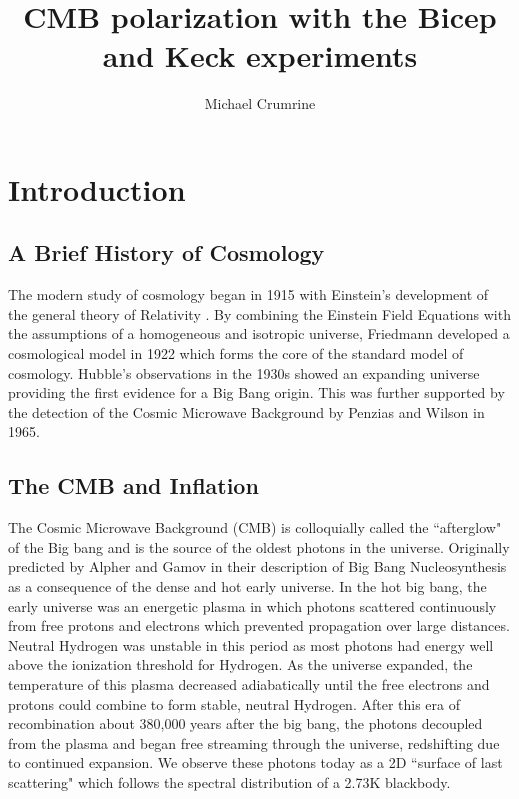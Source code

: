 \documentclass[12pt]{article}
\begin{document}
\author{Michael Crumrine}
\title{CMB polarization with the Bicep and Keck experiments}
\maketitle



\section{Introduction}

\subsection{A Brief History of Cosmology}
The modern study of cosmology began in 1915 with Einstein's development of the general
theory of Relativity \cite{cite:Einstein}. By combining the Einstein Field
Equations with the assumptions of a homogeneous and isotropic universe,
Friedmann developed a cosmological model in 1922 which forms the core of the standard
model of cosmology\cite{cite:Friedmann}. Hubble's observations in the 1930s
showed an expanding universe\cite{cite:Hubble} providing the first evidence
for a Big Bang origin. This was further supported by the detection of the
Cosmic Microwave Background by Penzias and Wilson in 1965\cite{cite:Penzias}.



\subsection{The CMB and Inflation}
The Cosmic Microwave Background (CMB) is colloquially called the ``afterglow"
of the Big bang and is the source of the oldest photons in the universe.
Originally predicted by Alpher and Gamov in their description of Big Bang
Nucleosynthesis as a consequence of the dense and hot early
universe\cite{cite:BBN}.  In the hot big bang, the early universe was an
energetic plasma in which photons scattered continuously from free protons and
electrons which prevented propagation over large distances.  Neutral Hydrogen
was unstable in this period as most photons had energy well above the
ionization threshold for Hydrogen. As the universe expanded, the temperature
of this plasma decreased adiabatically until the free electrons and protons
could combine to form stable, neutral Hydrogen. After this era of
recombination about 380,000 years after the big bang, the photons decoupled
from the plasma and began free streaming through the universe, redshifting due
to continued expansion. We observe these photons today as a 2D ``surface of last
scattering" which follows the spectral distribution of a 2.73K blackbody. 
\end{document}
